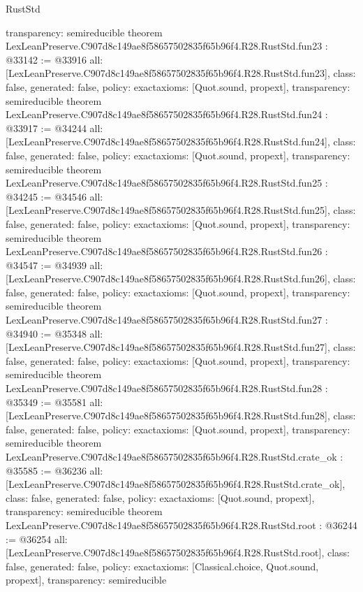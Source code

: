 \begin{lexlean}{RustStd}
\begin{coremodule}
{  transparency: semireducible
}
theorem LexLeanPreserve.C907d8c149ae8f58657502835f65b96f4.R28.RustStd.fun23 : @33142 := @33916 {
  all: [LexLeanPreserve.C907d8c149ae8f58657502835f65b96f4.R28.RustStd.fun23],
  class: false,
  generated: false,
  policy: exact{axioms: [Quot.sound, propext]},
  transparency: semireducible
}
theorem LexLeanPreserve.C907d8c149ae8f58657502835f65b96f4.R28.RustStd.fun24 : @33917 := @34244 {
  all: [LexLeanPreserve.C907d8c149ae8f58657502835f65b96f4.R28.RustStd.fun24],
  class: false,
  generated: false,
  policy: exact{axioms: [Quot.sound, propext]},
  transparency: semireducible
}
theorem LexLeanPreserve.C907d8c149ae8f58657502835f65b96f4.R28.RustStd.fun25 : @34245 := @34546 {
  all: [LexLeanPreserve.C907d8c149ae8f58657502835f65b96f4.R28.RustStd.fun25],
  class: false,
  generated: false,
  policy: exact{axioms: [Quot.sound, propext]},
  transparency: semireducible
}
theorem LexLeanPreserve.C907d8c149ae8f58657502835f65b96f4.R28.RustStd.fun26 : @34547 := @34939 {
  all: [LexLeanPreserve.C907d8c149ae8f58657502835f65b96f4.R28.RustStd.fun26],
  class: false,
  generated: false,
  policy: exact{axioms: [Quot.sound, propext]},
  transparency: semireducible
}
theorem LexLeanPreserve.C907d8c149ae8f58657502835f65b96f4.R28.RustStd.fun27 : @34940 := @35348 {
  all: [LexLeanPreserve.C907d8c149ae8f58657502835f65b96f4.R28.RustStd.fun27],
  class: false,
  generated: false,
  policy: exact{axioms: [Quot.sound, propext]},
  transparency: semireducible
}
theorem LexLeanPreserve.C907d8c149ae8f58657502835f65b96f4.R28.RustStd.fun28 : @35349 := @35581 {
  all: [LexLeanPreserve.C907d8c149ae8f58657502835f65b96f4.R28.RustStd.fun28],
  class: false,
  generated: false,
  policy: exact{axioms: [Quot.sound, propext]},
  transparency: semireducible
}
theorem LexLeanPreserve.C907d8c149ae8f58657502835f65b96f4.R28.RustStd.crate_ok : @35585 := @36236 {
  all: [LexLeanPreserve.C907d8c149ae8f58657502835f65b96f4.R28.RustStd.crate_ok],
  class: false,
  generated: false,
  policy: exact{axioms: [Quot.sound, propext]},
  transparency: semireducible
}
theorem LexLeanPreserve.C907d8c149ae8f58657502835f65b96f4.R28.RustStd.root : @36244 := @36254 {
  all: [LexLeanPreserve.C907d8c149ae8f58657502835f65b96f4.R28.RustStd.root],
  class: false,
  generated: false,
  policy: exact{axioms: [Classical.choice, Quot.sound, propext]},
  transparency: semireducible
}


\end{coremodule}
\end{lexlean}
